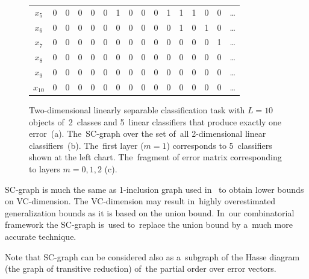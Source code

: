 \documentclass{article} %
\begin{document}
\begin{figure}[t]
\begin{tabular}{c|c|ccccc|cccccccc|c}
        $x_5$ & 0 & 0 & 0 & 0 & 0 & 1 & 0 & 0 & 0 & 1 & 1 & 1 & 0 & 0 & \ldots \\[-0.6ex]
        $x_6$ & 0 & 0 & 0 & 0 & 0 & 0 & 0 & 0 & 0 & 0 & 1 & 0 & 1 & 0 & \ldots \\[-0.6ex]
        $x_7$ & 0 & 0 & 0 & 0 & 0 & 0 & 0 & 0 & 0 & 0 & 0 & 0 & 0 & 1 & \ldots \\[-0.6ex]
        $x_8$ & 0 & 0 & 0 & 0 & 0 & 0 & 0 & 0 & 0 & 0 & 0 & 0 & 0 & 0 & \ldots \\[-0.6ex]
        $x_9$ & 0 & 0 & 0 & 0 & 0 & 0 & 0 & 0 & 0 & 0 & 0 & 0 & 0 & 0 & \ldots \\[-0.6ex]
     $x_{10}$ & 0 & 0 & 0 & 0 & 0 & 0 & 0 & 0 & 0 & 0 & 0 & 0 & 0 & 0 & \ldots
    \end{tabular}
    \caption{%
        Two-dimensional linearly separable classification task with ${L=10}$ objects of~2~classes
        and 5~linear classifiers that produce exactly one error~(a).
        The~SC-graph over the set of~all \mbox{2-dimensional} linear classifiers~(b).
        The~first layer (${m=1}$) corresponds to 5~classifiers shown at the left chart.
        The~fragment of error matrix corresponding to layers $m=0,1,2$ (c).
    }
    \label{fig:SC-graph-lin}
\end{figure}

SC-graph is much the same as 1-inclusion graph
used in~\cite{haussler94predicting} to obtain lower bounds on VC-dimension.
The VC-dimension may result in~highly overestimated generalization bounds as it is based on the union bound.
In~our combinatorial framework
the SC-graph is~used to~replace the union bound by a~much more accurate technique.

Note that SC-graph can be considered also
as a~subgraph of the Hasse diagram (the graph of transitive reduction)
of~the partial order over error vectors.
\end{document}
